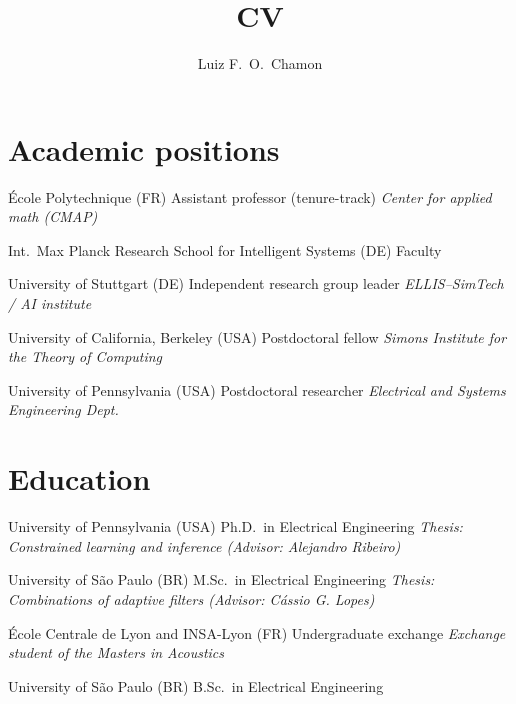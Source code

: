 \documentclass{cvlfoc}
\author[Luiz F.\ O.\ Chamon]{Luiz F.\ O.\ Chamon}
\title{CV}
\begin{document}
\maketitle
{}


\vspace{8mm}

\section*{Academic positions}

\begin{entrydate}
		{\'{E}cole Polytechnique (FR)}
		{Assistant professor (tenure-track)}
		{\emph{Center for applied math (CMAP)}}

		{Int.\ Max Planck Research School for Intelligent Systems (DE)}
		{Faculty}
		{}

		{University of Stuttgart (DE)}
		{Independent research group leader}
		{\emph{ELLIS--SimTech / AI institute}}

		{University of California, Berkeley (USA)}
		{Postdoctoral fellow}
		{\emph{Simons Institute for the Theory of Computing}}

		{University of Pennsylvania (USA)}
		{Postdoctoral researcher}
		{\emph{Electrical and Systems Engineering Dept.}}
\end{entrydate}

\vspace{2mm}


\section*{Education}

\begin{entrydate}
		{University of Pennsylvania (USA)}
		{Ph.D.\ in Electrical Engineering}
		{\emph{Thesis: Constrained learning and inference
			\hfill(Advisor: Alejandro Ribeiro)}}

		{University of S\~{a}o Paulo (BR)}
		{M.Sc.\ in Electrical Engineering}
		{\emph{Thesis: Combinations of adaptive filters
			\hfill(Advisor: C\'{a}ssio G. Lopes)}}

		{École Centrale de Lyon {\normalfont and} INSA-Lyon (FR)}
		{Undergraduate exchange}
		{\textit{Exchange student of the Masters in Acoustics}}

		{University of S\~{a}o Paulo (BR)}
		{B.Sc.\ in Electrical Engineering}
		{}
\end{entrydate}
\end{document}
